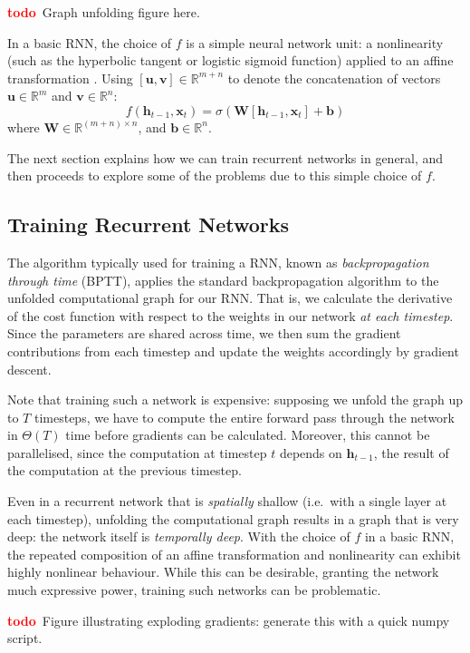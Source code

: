 \documentclass[12pt,a4paper,twoside,openright]{report}
\newcommand{\vect}[1]{\boldsymbol{\mathbf{#1}}}
\newcommand{\todo}{\textcolor{red}{\textbf{todo}~}}
\begin{document}
\todo Graph unfolding figure here.

In a basic RNN, the choice of $f$ is a simple neural network unit: a
nonlinearity (such as the hyperbolic tangent or logistic sigmoid function)
applied to an affine transformation \cite{zaremba2014recurrent}. Using
$[\vect{u},\vect{v}] \in \mathbb{R}^{m+n}$ to denote the concatenation of
vectors $\vect{u} \in \mathbb{R}^m$ and $\vect{v} \in \mathbb{R}^n$: 
$$f(\vect{h}_{t-1}, \vect{x}_t) = \sigma(\vect{W}[\vect{h}_{t-1}, 
\vect{x}_t] + \vect{b})$$ 
where $\vect{W} \in \mathbb{R}^{(m+n) \times n}$, and $\vect{b} \in
\mathbb{R}^n$. 

The next section explains how we can train recurrent networks in general, and
then proceeds to explore some of the problems due to this simple choice of $f$.

\subsection{Training Recurrent Networks}

The algorithm typically used for training a RNN, known as \emph{backpropagation
through time} (BPTT), applies the standard backpropagation algorithm to the
unfolded computational graph for our RNN. That is, we calculate the derivative
of the cost function with respect to the weights in our network \emph{at each
timestep}. Since the parameters are shared across time, we then sum the gradient
contributions from each timestep and update the weights accordingly by gradient
descent.

Note that training such a network is expensive: supposing we unfold the graph up
to $T$ timesteps, we have to compute the entire forward pass through the network
in $\Theta(T)$ time before gradients can be calculated. Moreover, this cannot be
parallelised, since the computation at timestep $t$ depends on
$\vect{h}_{t-1}$, the result of the computation at the previous timestep.

Even in a recurrent network that is \emph{spatially} shallow (i.e.\ with a
single layer at each timestep), unfolding the computational graph results in a
graph that is very deep: the network itself is \emph{temporally deep}. With the
choice of $f$ in a basic RNN, the repeated composition of an affine
transformation and nonlinearity can exhibit highly nonlinear behaviour. While
this can be desirable, granting the network much expressive power, training such
networks can be problematic. 

\todo Figure illustrating exploding gradients: generate this with a quick numpy
script.
\end{document}
